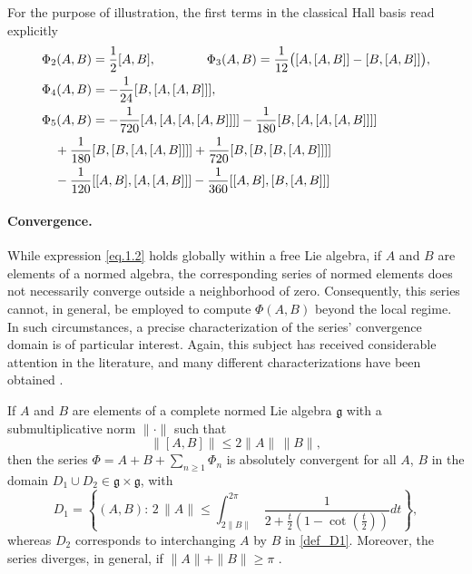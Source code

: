 \documentclass[11pt]{article}
\begin{document}
For the purpose of illustration, the first terms in the classical Hall basis read explicitly
\begin{equation} \label{explic_expre}
\aligned &  \Phi_2(A,B)  =  \frac{1}{2} [A,B], \qquad\qquad  \Phi_3(A,B)  =  \frac{1}{12} \big([A,[A,B]] -   [B,[A,B]] \big), \\
& \Phi_4(A,B)  =  -\frac{1}{24}  [B, [A,[A,B]]], \\
  & \Phi_5(A,B) =   -\frac{1}{720} [A,[A,[A,[A,B]]]] - \frac{1}{180}  [B,[A,[A,[A,B]]]]  \\
  & \quad + \frac{1}{180}  [B,[B,[A,[A,B]]]]  +  \frac{1}{720}  [B,[B,[B,[A,B]]]] \\
  & \quad - \frac{1}{120}  [[A,B],[A,[A,B]]]  - \frac{1}{360}  [[A,B],[B,[A,B]]]
\endaligned
\end{equation}

\paragraph{Convergence.} While expression \eqref{eq.1.2} holds globally within a free Lie algebra, if $A$ and $B$ are elements of a normed algebra, the corresponding series of normed elements does not necessarily converge outside a neighborhood of zero. Consequently, this series cannot, in general, be employed to compute $\Phi(A,B)$ beyond the local regime. In such circumstances, a precise characterization of the series' convergence domain is of particular 
interest. Again, this subject has received considerable attention in the literature, and many different characterizations have been obtained \cite{bonfiglioli12tin}.

If $A$ and $B$ are elements of a complete normed Lie algebra $\mathfrak{g}$ with a submultiplicative norm $\| \cdot \|$ such that
\[
  \| [A,B]\| \le 2 \|A\| \, \|B\|,
\]  
then the series $\Phi = A + B + \sum_{n\ge 1} \Phi_n$ is absolutely convergent for all $A$, $B$ in the domain $D_1 \cup D_2 \in \mathfrak{g} \times \mathfrak{g}$,
with 
\begin{equation} \label{def_D1}
  D_1 = \left\{ (A,B): \, 2 \, \|A\| \le \int_{2 \|B\|}^{2 \pi} \, \frac{1}{2 + \frac{t}{2} \left( 1 - \cot \left(\frac{t}{2} \right) \right)} dt \right\},
\end{equation}
whereas $D_2$ corresponds to interchanging $A$ by $B$ in \eqref{def_D1}. Moreover, the series diverges, in general, if $\|A\| + \|B\| \ge \pi$ \cite{blanes04otc}.
\end{document}
